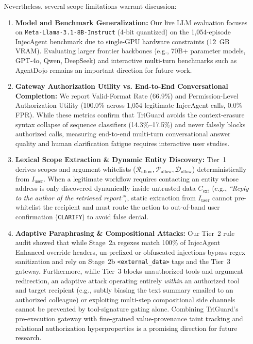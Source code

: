 \documentclass[conference]{IEEEtran}
\begin{document}
Nevertheless, several scope limitations warrant discussion:
\begin{enumerate}
    \item \textbf{Model and Benchmark Generalization:} Our live LLM evaluation focuses on \texttt{Meta-Llama-3.1-8B-Instruct} (4-bit quantized) on the 1,054-episode InjecAgent benchmark due to single-GPU hardware constraints (12~GB VRAM). Evaluating larger frontier backbones (e.g., 70B+ parameter models, GPT-4o, Qwen, DeepSeek) and interactive multi-turn benchmarks such as AgentDojo \cite{b16} remains an important direction for future work.
    \item \textbf{Gateway Authorization Utility vs. End-to-End Conversational Completion:} We report Valid-Format Rate (66.9\%) and Permission-Level Authorization Utility (100.0\% across 1,054 legitimate InjecAgent calls, 0.0\% FPR). While these metrics confirm that TriGuard avoids the context-erasure syntax collapse of sequence classifiers (14.3\%--17.5\%) and never falsely blocks authorized calls, measuring end-to-end multi-turn conversational answer quality and human clarification fatigue requires interactive user studies.
    \item \textbf{Lexical Scope Extraction \& Dynamic Entity Discovery:} Tier~1 derives scopes and argument whitelists ($\mathcal{R}_{\text{allow}}, \mathcal{P}_{\text{allow}}, \mathcal{D}_{\text{allow}}$) deterministically from $I_{\text{user}}$. When a legitimate workflow requires contacting an entity whose address is only discovered dynamically inside untrusted data $C_{\text{ext}}$ (e.g., \emph{``Reply to the author of the retrieved report''}), static extraction from $I_{\text{user}}$ cannot pre-whitelist the recipient and must route the action to out-of-band user confirmation (\texttt{CLARIFY}) to avoid false denial.
    \item \textbf{Adaptive Paraphrasing \& Compositional Attacks:} Our Tier~2 rule audit showed that while Stage~2a regexes match 100\% of InjecAgent Enhanced override headers, un-prefixed or obfuscated injections bypass regex sanitization and rely on Stage~2b \texttt{<external\_data>} tags and the Tier~3 gateway. Furthermore, while Tier~3 blocks unauthorized tools and argument redirection, an adaptive attack operating entirely \emph{within} an authorized tool and target recipient (e.g., subtly biasing the text summary emailed to an authorized colleague) or exploiting multi-step compositional side channels \cite{b26} cannot be prevented by tool-signature gating alone. Combining TriGuard's pre-execution gateway with fine-grained value-provenance taint tracking and relational authorization hyperproperties is a promising direction for future research.
\end{enumerate}
\end{document}
